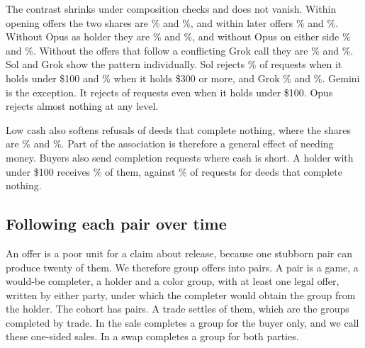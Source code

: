 The contrast shrinks under composition checks and does not vanish. Within opening offers the two shares are \% and \%, and within later offers \% and \%. Without Opus as holder they are \% and \%, and without Opus on either side \% and \%. Without the offers that follow a conflicting Grok call they are \% and \%. Sol and Grok show the pattern individually. Sol rejects \% of requests when it holds under \$100 and \% when it holds \$300 or more, and Grok \% and \%. Gemini is the exception. It rejects  of  requests even when it holds under \$100. Opus rejects almost nothing at any level.

Low cash also softens refusals of deeds that complete nothing, where the shares are \% and \%. Part of the association is therefore a general effect of needing money. Buyers also send completion requests where cash is short. A holder with under \$100 receives \% of them, against \% of requests for deeds that complete nothing.

\subsection{Following each pair over time}

An offer is a poor unit for a claim about release, because one stubborn pair can produce twenty of them. We therefore group offers into pairs. A pair is a game, a would-be completer, a holder and a color group, with at least one legal offer, written by either party, under which the completer would obtain the group from the holder. The cohort has  pairs. A trade settles  of them, which are the  groups completed by trade. In  the sale completes a group for the buyer only, and we call these one-sided sales. In  a swap completes a group for both parties.

